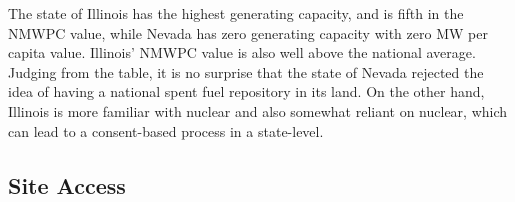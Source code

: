 \begin{table}[h]
	
	\centering
	\caption {\gls{NMWPC} values for different states}

	\end{table}
	
	
The state of Illinois has the highest generating capacity, and is fifth in the \gls{NMWPC}
 value, while Nevada has zero generating capacity with zero MW per capita value. 
Illinois' \gls{NMWPC} value is also well above the national average. Judging from the
table, it is no surprise that the state of Nevada rejected the idea of having a national
spent fuel repository in its land. On the other hand, Illinois is more familiar with 
nuclear and also somewhat reliant on nuclear, which can lead to a consent-based process
in a state-level. 

	 
\subsection{Site Access}




